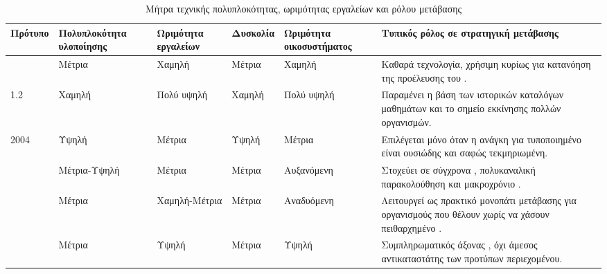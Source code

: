 \begin{table}[H]
\centering
\caption{Μήτρα τεχνικής πολυπλοκότητας, ωριμότητας εργαλείων και ρόλου μετάβασης}
\label{tab:complexity_adoption_matrix}
\small
\setlength{\tabcolsep}{5pt}
\renewcommand{\arraystretch}{1.25}
\begin{chaptertablebox}
\begin{tabularx}{\textwidth}{|p{1.8cm}|p{2.1cm}|p{2.2cm}|p{2.0cm}|p{2.4cm}|Y|}
\hline
\textbf{Πρότυπο} & \textbf{Πολυπλοκότητα υλοποίησης} & \textbf{Ωριμότητα εργαλείων} & \textbf{Δυσκολία } & \textbf{Ωριμότητα οικοσυστήματος} & \textbf{Τυπικός ρόλος σε στρατηγική μετάβασης} \\
\hline
{} & Μέτρια & Χαμηλή & Μέτρια & Χαμηλή & Καθαρά  τεχνολογία, χρήσιμη κυρίως για κατανόηση της προέλευσης του . \\
\hline
{} 1.2 & Χαμηλή & Πολύ υψηλή & Χαμηλή & Πολύ υψηλή & Παραμένει η βάση των ιστορικών καταλόγων μαθημάτων και το σημείο εκκίνησης πολλών οργανισμών. \\
\hline
{} 2004 & Υψηλή & Μέτρια & Υψηλή & Μέτρια & Επιλέγεται μόνο όταν η ανάγκη για τυποποιημένο  είναι ουσιώδης και σαφώς τεκμηριωμένη. \\
\hline
{} & Μέτρια-Υψηλή & Μέτρια & Μέτρια & Αυξανόμενη & Στοχεύει σε σύγχρονα , πολυκαναλική παρακολούθηση και μακροχρόνιο . \\
\hline
{} & Μέτρια & Χαμηλή-Μέτρια & Μέτρια & Αναδυόμενη & Λειτουργεί ως πρακτικό μονοπάτι μετάβασης για οργανισμούς που θέλουν  χωρίς να χάσουν πειθαρχημένο . \\
\hline
{} & Μέτρια & Υψηλή & Μέτρια & Υψηλή & Συμπληρωματικός άξονας , όχι άμεσος αντικαταστάτης των προτύπων περιεχομένου. \\
\hline
\end{tabularx}
\end{chaptertablebox}
\end{table}
